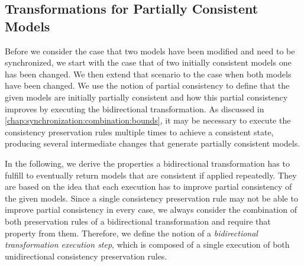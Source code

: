 \subsection{Transformations for Partially Consistent Models}
\label{chap:synchronization:bidirectional:transformations}


Before we consider the case that two models have been modified and need to be synchronized, we start with the case that of two initially consistent models one has been changed.
We then extend that scenario to the case when both models have been changed.
We use the notion of partial consistency to define that the given models are initially partially consistent and how this partial consistency improves by executing the bidirectional transformation.
As discussed in \autoref{chap:synchronization:combination:bounds}, it may be necessary to execute the consistency preservation rules multiple times to achieve a consistent state, producing several intermediate changes that generate partially consistent models.

In the following, we derive the properties a bidirectional transformation has to fulfill to eventually return models that are consistent if applied repeatedly.
They are based on the idea that each execution has to improve partial consistency of the given models.
Since a single consistency preservation rule may not be able to improve partial consistency in every case, we always consider the combination of both preservation rules of a bidirectional transformation and require that property from them.
Therefore, we define the notion of a \emph{bidirectional transformation execution step}, which is composed of a single execution of both unidirectional consistency preservation rules.

